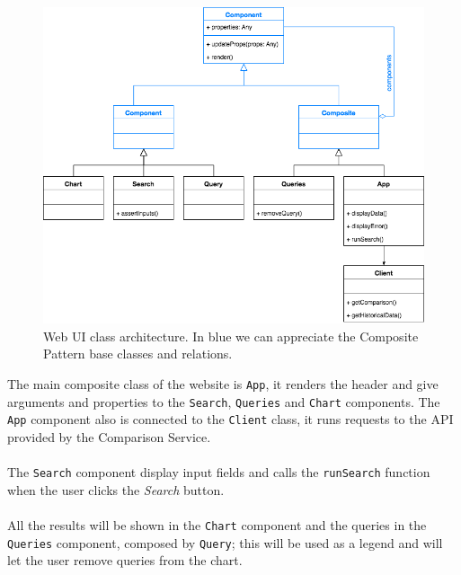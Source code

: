 \begin{figure}[H]
\centering
\includegraphics[scale=0.5]{diagrams/web-ui-architecture.png}
\caption{Web UI class architecture. In blue we can appreciate the Composite Pattern base classes and relations.}
\end{figure}

The main composite class of the website is \texttt{App}, it renders the header and give arguments and properties to the \texttt{Search}, \texttt{Queries} and \texttt{Chart} components. The \texttt{App} component also is connected to the \texttt{Client} class, it runs requests to the API provided by the Comparison Service.
\\\\
The \texttt{Search} component display input fields and calls the \texttt{runSearch} function when the user clicks the \textit{Search} button.
\\\\
All the results will be shown in the \texttt{Chart} component and the queries in the \texttt{Queries} component, composed by \texttt{Query}; this will be used as a legend and will let the user remove queries from the chart.

